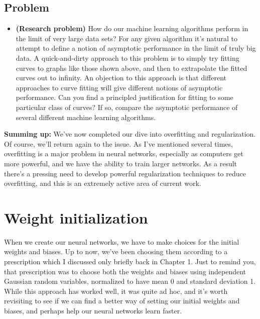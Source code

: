 \documentclass[a4paper,twoside,10pt]{book}
\begin{document}
\subsection*{Problem}
\begin{itemize}
	\item \textbf{(Research problem)} How do our machine learning algorithms perform in the limit of very large data sets? For any given algorithm it's natural to attempt to define a notion of asymptotic performance in the limit of truly big data. A quick-and-dirty approach to this problem is to simply try fitting curves to graphs like those shown above, and then to extrapolate the fitted curves out to infinity. An objection to this approach is that different approaches to curve fitting will give different notions of asymptotic performance. Can you find a principled justification for fitting to some particular class of curves? If so, compare the asymptotic performance of several different machine learning algorithms.
\end{itemize}
\textbf{Summing up:} We've now completed our dive into overfitting and regularization. Of course, we'll return again to the issue. As I've mentioned several times, overfitting is a major problem in neural networks, especially as computers get more powerful, and we have the ability to train larger networks. As a result there's a pressing need to develop powerful regularization techniques to reduce overfitting, and this is an extremely active area of current work.

\section{Weight initialization}
When we create our neural networks, we have to make choices for the initial weights and biases. Up to now, we've been choosing them according to a prescription which I discussed only briefly back in Chapter 1. Just to remind you, that prescription was to choose both the weights and biases using independent Gaussian random variables, normalized to have mean 0 and standard deviation 1. While this approach has worked well, it was quite ad hoc, and it's worth revisiting to see if we can find a better way of setting our initial weights and biases, and perhaps help our neural networks learn faster.
\end{document}
